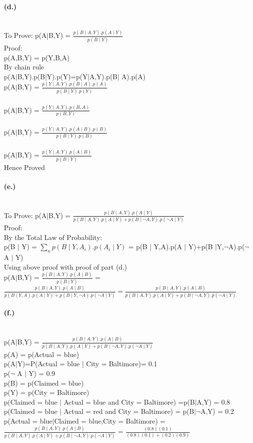 \documentclass{article}
\begin{document}
\paragraph{(d.)}
\\To Prove:
p(A$\mid$B,Y) = $\frac{p(B\mid A,Y).p(A\mid Y)}{p(B \mid Y)}$
\\Proof:
\\p(A,B,Y) = p(Y,B,A)
\\By chain rule
\\p(A$\mid$B,Y).p(B$\mid$Y).p(Y)=p(Y$\mid$A,Y).p(B$\mid$ A).p(A)
\\p(A$\mid$B,Y) = $\frac{p(Y\mid A,Y).p(B \mid A).p(A)}{p(B\mid Y).p(Y)}$
\\
\\p(A$\mid$B,Y) = $\frac{p(Y\mid A,Y).p(B,A)}{p(B,Y)}$
\\
\\p(A$\mid$B,Y) = $\frac{p(Y\mid A,Y).p(A\mid B).p(B)}{p(B \mid Y).p(B)}$
\\
\\p(A$\mid$B,Y) = $\frac{p(Y\mid A,Y).p(A\mid B)}{p(B \mid Y)}$
\\Hence Proved
\paragraph{(e.)}
\\To Prove: p(A$\mid$B,Y) = $\frac{p(B\mid A,Y).p(A\mid Y)}{p(B \mid A,Y).p(A \mid Y)+p(B \mid \neg A,Y).p(\neg A \mid Y)}$
\\Proof:
\\By the Total Law of Probability:
\\p(B $\mid$ Y) = $\sum_n p(B \mid Y, A_i).p(A_i \mid Y)$ = p(B $\mid$ Y,A).p(A $\mid$ Y)+p(B $\mid$Y,$\neg $A).p($\neg$A $\mid$ Y)
\\Using above proof with proof of part (d.)
\\p(A$\mid$B,Y) = $\frac{p(B\mid A,Y).p(A\mid B)}{p(B \mid Y)}$ = $\frac{p(B\mid A,Y).p(A\mid B)}{p(B \mid Y,A).p(A \mid Y)+p(B \mid Y,\neg A).p(\neg A \mid Y)} = \frac{p(B\mid A,Y).p(A\mid B)}{p(B \mid A,Y).p(A \mid Y)+p(B \mid \neg A,Y).p(\neg A \mid Y)}$
\paragraph{(f.)}
\\p(A$\mid$B,Y) = $\frac{p(B\mid A,Y).p(A\mid B)}{p(B \mid A,Y).p(A \mid Y)+p(B \mid \neg A,Y).p(\neg A \mid Y)}$
\\p(A) = p(Actual = blue)
\\p(A$\mid$Y)=P(Actual = blue $\mid$ City = Baltimore)= 0.1
\\p($\neg$ A $\mid$ Y) = 0.9
\\p(B) = p(Claimed = blue)
\\p(Y) = p(City = Baltimore)
\\p(Claimed = blue $\mid$ Actual = blue and City = Baltimore) =p(B$\mid$A,Y) = 0.8
\\p(Claimed = blue $\mid$ Actual = red and City = Baltimore) = p(B$\mid \neg$A,Y) = 0.2
\\p(Actual = blue$\mid$Claimed = blue,City = Baltimore) = $\frac{p(B\mid A,Y).p(A\mid B)}{p(B \mid A,Y).p(A \mid Y)+p(B \mid \neg A,Y).p(\neg A \mid Y)}$
= $\frac{(0.8)(0.1)}{(0.8)(0.1)+(0.2)(0.9)}$
\end{document}
